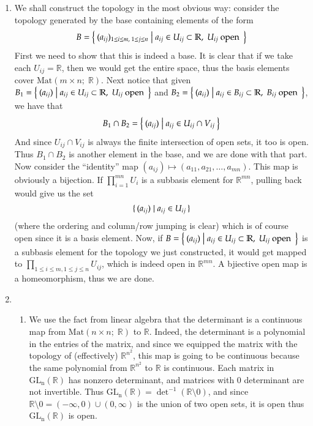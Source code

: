 \documentclass[12pt]{article}
\theoremstyle{definitionstyle}
\def\mbb#1{\mathbb{#1}}
\def \R{\mbb{R}}
\begin{document}
\begin{enumerate}[leftmargin=\labelsep]
		\item We shall construct the topology in the most obvious way: consider the topology generated by the base containing elements of the form
		\begin{align*}
			B = \Set{(a_{ij})_{1 \leq i \leq m, \; 1 \leq j \leq n} | a_{ij} \in U_{ij} \subset \R, \; U_{ij} \text{ open }}
		\end{align*}
		First we need to show that this is indeed a base. It is clear that if we take each $U_{ij} = \R$, then we would get the entire space, thus the basis elements cover $\mathrm{Mat}(m \times n;\; \R)$. Next notice that given $B_1 = \Set{(a_{ij}) | a_{ij} \in U_{ij} \subset \R, \; U_{ij} \text{ open }}$ and $B_2 = \Set{(a_{ij}) | a_{ij} \in B_{ij} \subset \R, \; B_{ij} \text{ open }}$, we have that
		\begin{align*}
			B_1 \cap B_2 = \Set{(a_{ij}) | a_{ij} \in U_{ij} \cap V_{ij}}
		\end{align*}
		And since $U_{ij} \cap V_{ij}$ is always the finite intersection of open sets, it too is open. Thus $B_1 \cap B_2$ is another element in the base, and we are done with that part. Now consider the ``identity'' map $(a_{ij}) \mapsto (a_{11}, a_{21}, \ldots, a_{mn})$. This map is obviously a bijection. If $\prod_{i=1}^{mn} U_i$ is a subbasis element for $\R^{mn}$, pulling back would give us the set 
		\begin{align*}
			\set{(a_{ij}) | a_{ij} \in U_{ij}}
		\end{align*}
		(where the ordering and column/row jumping is clear) which is of course open since it is a basis element. Now, if $B = \Set{(a_{ij}) | a_{ij} \in U_{ij} \subset \R, \; U_{ij} \text{ open }}$ is a subbasis element for the topology we just constructed, it would get mapped to $\prod_{1 \leq i \leq m, 1 \leq j \leq n} U_{ij}$, which is indeed open in $\R^{mn}$. A bjiective open map is a homeomorphism, thus we are done.
		
		\item \begin{enumerate}
			\item We use the fact from linear algebra that the determinant is a continuous map from $\mathrm{Mat}(n \times n;\; \R)$ to $\R$. Indeed, the determinant is a polynomial in the entries of the matrix, and since we equipped the matrix with the topology of (effectively) $\R^{n^2}$, this map is going to be continuous because the same polynomial from $\R^{n^2}$ to $\R$ is continuous. Each matrix in $\mathrm{GL_n}(\R)$ has nonzero determinant, and matrices with 0 determinant are not invertible. Thus $\mathrm{GL_n}(\R) = \det^{-1}(\R \setminus 0)$, and since $\R \setminus 0 = (-\infty, 0) \cup (0, \infty)$ is the union of two open sets, it is open thus  $\mathrm{GL_n}(\R)$ is open. 
			

\end{enumerate}
\end{enumerate}
\end{document}
